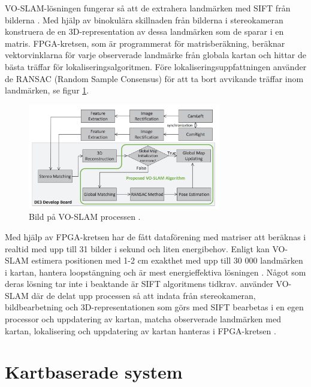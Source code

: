 VO-SLAM-lösningen fungerar så att de extrahera landmärken med SIFT från bilderna \citep{voslam}. Med hjälp av binokulära skillnaden från bilderna i stereokameran konstruera de en 3D-representation av dessa landmärken som de sparar i en matris. FPGA-kretsen, som är programmerat för matrisberäkning, beräknar vektorvinklarna för varje observerade landmärke från globala kartan och hittar de bästa träffar för lokaliseringsalgoritmen. Före lokaliseringsuppfattningen använder de RANSAC (Random Sample Consensus) för att ta bort avvikande träffar inom landmärken, se figur \ref{voslamprocess}. 

\begin{figure}[ht]
    \begin{center}
    \includegraphics[width=0.75\textwidth]{voslam.JPG}
    \caption{Bild på VO-SLAM processen \citep{voslam}.}
    \label{voslamprocess}
    \end{center}
\end{figure}

Med hjälp av FPGA-kretsen har de fått dataförening med matriser att beräknas i realtid med upp till 31 bilder i sekund och liten energibehov. Enligt \cite{voslam} kan VO-SLAM estimera positionen med 1-2 cm exakthet med upp till 30 000 landmärken i kartan, hantera loopstängning och är mest energieffektiva lösningen \citep{voslam}. Något som deras lösning tar inte i beaktande är SIFT algoritmens tidkrav. \cite{voslamlatif} använder VO-SLAM där de delat upp processen så att indata från stereokameran, bildbearbetning och 3D-representationen som görs med SIFT bearbetas i en egen processor och uppdatering av kartan, matcha observerade landmärken med kartan, lokalisering och uppdatering av kartan hanteras i FPGA-kretsen \citep{voslamlatif}. 

\section{Kartbaserade system}

